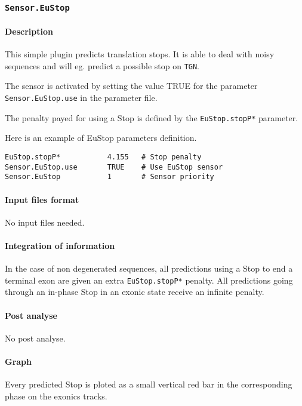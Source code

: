 
\subsubsection{\texttt{Sensor.EuStop}}

\paragraph{Description}

This simple plugin predicts translation stops. It is able to deal with
noisy sequences and will eg. predict a possible stop on \texttt{TGN}.

The sensor is activated by setting the value TRUE for the parameter
\texttt{Sensor.EuStop.use} in the parameter file.

The penalty payed for using a Stop is defined by the
\texttt{EuStop.stopP*} parameter.

Here is an example of EuStop parameters definition.
\begin{Verbatim}[fontsize=\small]
EuStop.stopP*           4.155   # Stop penalty
Sensor.EuStop.use       TRUE    # Use EuStop sensor
Sensor.EuStop           1       # Sensor priority
\end{Verbatim}

\paragraph{Input files format}

No input files  needed.

\paragraph{Integration of information}

In the case of non degenerated sequences, all predictions using a Stop
to end a terminal exon are given an extra \texttt{EuStop.stopP*}
penalty. All predictions going through an in-phase Stop in an exonic
state receive an infinite penalty.

\paragraph{Post analyse}

No post analyse.

\paragraph{Graph}

Every predicted Stop is ploted as a small vertical red bar in the
corresponding phase on the exonics tracks.


